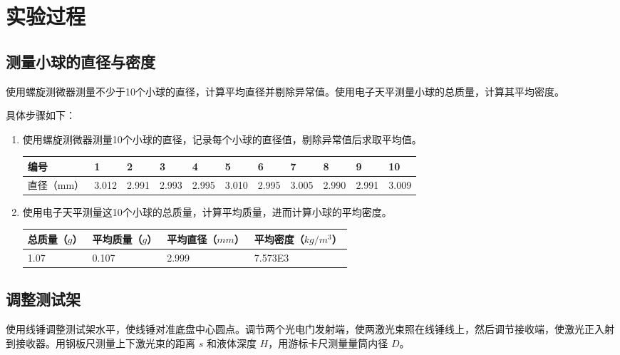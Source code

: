 \documentclass[UTF8]{ctexart}
\begin{document}
\section{实验过程}

\subsection{测量小球的直径与密度}
使用螺旋测微器测量不少于10个小球的直径，计算平均直径并剔除异常值。使用电子天平测量小球的总质量，计算其平均密度。

具体步骤如下：
\begin{enumerate}
    \item 使用螺旋测微器测量10个小球的直径，记录每个小球的直径值，剔除异常值后求取平均值。
    \begin{table}[H]
        \centering
        \begin{tabular}{l|llllllllll}
        \toprule
        编号&1&2&3&4&5&6&7&8&9&10\\
        \midrule
        直径（mm）&3.012&2.991&2.993&2.995&3.010&2.995&3.005&2.990&2.991&3.009\\
        \bottomrule
        \end{tabular}
    \end{table}

    \item 使用电子天平测量这10个小球的总质量，计算平均质量，进而计算小球的平均密度。
    \begin{table}[H]
        \centering
        \begin{tabular}{llll}
        \toprule
        总质量（$g$）&平均质量（$g$）&平均直径（$mm$）&平均密度（$kg/m^3$）\\
        \midrule
        1.07&0.107&2.999&7.573E3\\
        \bottomrule
        \end{tabular}
    \end{table}
\end{enumerate}

\subsection{调整测试架}
使用线锤调整测试架水平，使线锤对准底盘中心圆点。调节两个光电门发射端，使两激光束照在线锤线上，然后调节接收端，使激光正入射到接收器。用钢板尺测量上下激光束的距离 \(s\) 和液体深度 \(H\)，用游标卡尺测量量筒内径 \(D\)。
\end{document}
